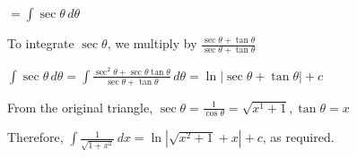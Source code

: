 \documentclass[../main.tex]{subfiles}
\begin{document}
\begin{enumerate}
    \(=\int \sec{\theta}\,d\theta\)

    To integrate \(\sec{\theta}\), we multiply by \(\frac{\sec{\theta}+\tan{\theta}}{\sec{\theta}+\tan{\theta}}\)

    \(\int \sec{\theta}\,d\theta=\int \frac{\sec^2{\theta}+\sec{\theta}\tan{\theta}}{\sec{\theta}+\tan{\theta}}\,d\theta=\ln{|\sec{\theta}+\tan{\theta}|}+c\)

    From the original triangle, \(\sec{\theta}=\frac{1}{\cos{\theta}}=\sqrt{x^1+1}, \tan{\theta}=x\)

    Therefore, \(\int \frac{1}{\sqrt{1+x^2}}\,dx=\ln{|\sqrt{x^2+1}+x|}+c\), as required.
    
\end{enumerate}


\pagebreak
\end{document}
